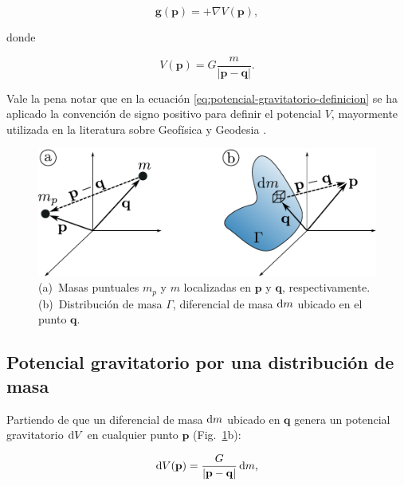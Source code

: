 \begin{equation}
    \mathbf{g}(\mathbf{p}) = + \nabla V(\mathbf{p}),
    \label{eq:potencial-gravitatorio-definicion}
\end{equation}

\noindent donde

\begin{equation}
    V(\mathbf{p}) = G \frac{m}{|\mathbf{p} - \mathbf{q}|}.
    \label{eq:potencial-gravitatorio-particula}
\end{equation}

\noindent Vale la pena notar que en la ecuación
\ref{eq:potencial-gravitatorio-definicion} se ha aplicado la convención de
signo positivo para definir el potencial $V$, mayormente utilizada en la
literatura sobre Geofísica y Geodesia
\citep{heiskanen1967,blakely1995,hinze2009}.

\begin{figure}
    \centering
    \includegraphics[width=\linewidth]{figs/gravity-potentials.pdf}
    \caption{
        (a)~Masas puntuales $m_p$ y $m$ localizadas en $\mathbf{p}$
        y $\mathbf{q}$, respectivamente.
        (b)~Distribución de masa $\Gamma$, diferencial de masa $\mathop{}\!\textnormal{d} m$
        ubicado en el punto $\mathbf{q}$.
    }
    \label{fig:potencial-gravitatorio}
\end{figure}


\subsection{Potencial gravitatorio por una distribución de masa}

Partiendo de que un diferencial de masa $\mathop{}\!\textnormal{d} m$ ubicado en $\mathbf{q}$
genera un potencial gravitatorio $\mathop{}\!\textnormal{d} V$ en cualquier punto $\mathbf{p}$
(Fig.~\ref{fig:potencial-gravitatorio}b):

\begin{equation}
    \mathop{}\!\textnormal{d} V(\mathbf{p}) = \frac{G}{|\mathbf{p} - \mathbf{q}|} \mathop{}\!\textnormal{d} m,
\end{equation}


